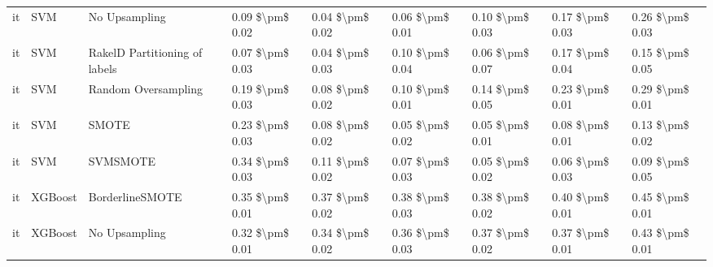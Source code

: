 \begin{tabular}{lllllllll}
      it &                             SVM &                 No Upsampling & 0.09 \$\textbackslash pm\$ 0.02 &           0.04 \$\textbackslash pm\$ 0.02 &       0.06 \$\textbackslash pm\$ 0.01 &        0.10 \$\textbackslash pm\$ 0.03 &                         0.17 \$\textbackslash pm\$ 0.03 &     0.26 \$\textbackslash pm\$ 0.03 \\
      it &                             SVM & RakelD Partitioning of labels & 0.07 \$\textbackslash pm\$ 0.03 &           0.04 \$\textbackslash pm\$ 0.03 &       0.10 \$\textbackslash pm\$ 0.04 &        0.06 \$\textbackslash pm\$ 0.07 &                         0.17 \$\textbackslash pm\$ 0.04 &     0.15 \$\textbackslash pm\$ 0.05 \\
      it &                             SVM &           Random Oversampling & 0.19 \$\textbackslash pm\$ 0.03 &           0.08 \$\textbackslash pm\$ 0.02 &       0.10 \$\textbackslash pm\$ 0.01 &        0.14 \$\textbackslash pm\$ 0.05 &                         0.23 \$\textbackslash pm\$ 0.01 &     0.29 \$\textbackslash pm\$ 0.01 \\
      it &                             SVM &                         SMOTE & 0.23 \$\textbackslash pm\$ 0.03 &           0.08 \$\textbackslash pm\$ 0.02 &       0.05 \$\textbackslash pm\$ 0.02 &        0.05 \$\textbackslash pm\$ 0.01 &                         0.08 \$\textbackslash pm\$ 0.01 &     0.13 \$\textbackslash pm\$ 0.02 \\
      it &                             SVM &                      SVMSMOTE & 0.34 \$\textbackslash pm\$ 0.03 &           0.11 \$\textbackslash pm\$ 0.02 &       0.07 \$\textbackslash pm\$ 0.03 &        0.05 \$\textbackslash pm\$ 0.02 &                         0.06 \$\textbackslash pm\$ 0.03 &     0.09 \$\textbackslash pm\$ 0.05 \\
      it &                         XGBoost &               BorderlineSMOTE & 0.35 \$\textbackslash pm\$ 0.01 &           0.37 \$\textbackslash pm\$ 0.02 &       0.38 \$\textbackslash pm\$ 0.03 &        0.38 \$\textbackslash pm\$ 0.02 &                         0.40 \$\textbackslash pm\$ 0.01 &     0.45 \$\textbackslash pm\$ 0.01 \\
      it &                         XGBoost &                 No Upsampling & 0.32 \$\textbackslash pm\$ 0.01 &           0.34 \$\textbackslash pm\$ 0.02 &       0.36 \$\textbackslash pm\$ 0.03 &        0.37 \$\textbackslash pm\$ 0.02 &                         0.37 \$\textbackslash pm\$ 0.01 &     0.43 \$\textbackslash pm\$ 0.01 \\

\end{tabular}
